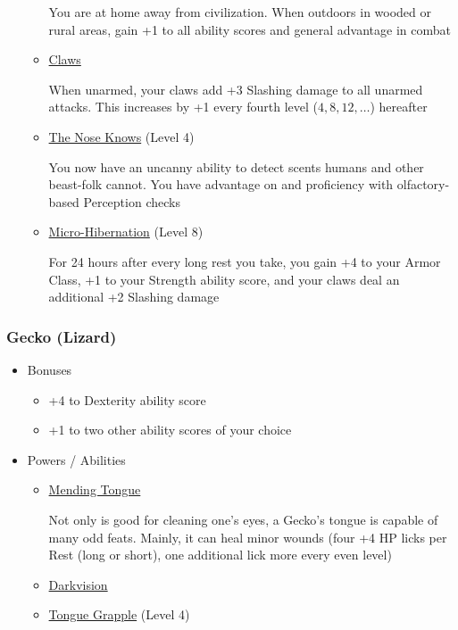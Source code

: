 \documentclass[12pt, landscape]{article}
\begin{document}
\begin{FlushLeft}
\begin{multicols}{2}
\begin{itemize}[wide]
\begin{itemize}
					You are at home away from civilization.
					When outdoors in wooded or rural areas, gain +1 to all ability scores and general advantage in combat
					\item \underline{Claws}

					When unarmed, your claws add +3 Slashing damage to all unarmed attacks.
					This increases by +1 every fourth level ($4, 8, 12, \dots$) hereafter

					\item \underline{The Nose Knows} (Level 4)

					You now have an uncanny ability to detect scents humans and other beast-folk cannot.
					You have advantage on and proficiency with olfactory-based Perception checks
					
					\item \underline{Micro-Hibernation} (Level 8)

					For 24 hours after every long rest you take, you gain +4 to your Armor Class, +1 to your Strength ability score, and your claws deal an additional +2 Slashing damage
				\end{itemize}
			\end{itemize}
			\vfill \null \columnbreak

			\subsubsection{Gecko (Lizard)}
			\begin{itemize}[wide]
				\item Bonuses
				\begin{itemize}
					\item +4 to Dexterity ability score
					\item +1 to two other ability scores of your choice
				\end{itemize}
				\item Powers / Abilities
				\begin{itemize}
					\item \underline{Mending Tongue}

					Not only is good for cleaning one's eyes, a Gecko’s tongue is capable of many odd feats.
					Mainly, it can heal minor wounds (four +4 HP licks per Rest (long or short), one additional lick more every even level)

					\item \underline{Darkvision}
					\item \underline{Tongue Grapple} (Level 4)


\end{itemize}
\end{itemize}
\end{multicols}
\end{FlushLeft}
\end{document}
